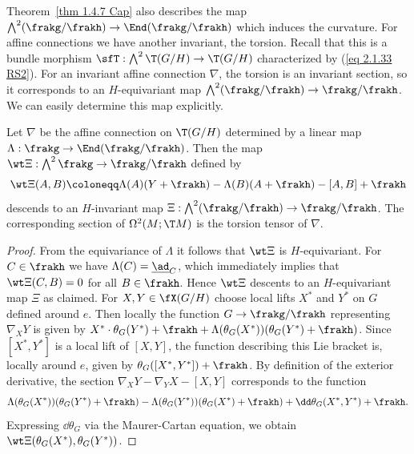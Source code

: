 Theorem~\ref{thm 1.4.7 Cap} also describes the map $\bigwedge^2(\frakg\slash\frakh)\to \End(\frakg\slash\frakh)$ which induces the curvature. For affine connections we have another invariant, the torsion. Recall that this is a bundle morphism $\sfT:\bigwedge^2 \T(G\slash H)\to \T(G\slash H)$ characterized by (\ref{eq 2.1.33 RS2}). For an invariant affine connection $\nabla$, the torsion is an invariant section, so it corresponds to an $H$-equivariant map $\bigwedge^2(\frakg\slash\frakh)\to \frakg\slash\frakh$. We can easily determine this map explicitly.

\begin{prop}\label{prop 1.4.8 Cap}
    Let $\nabla$ be the affine connection on $\T(G\slash H)$ determined by a linear map $\Lambda:\frakg\to\End(\frakg\slash\frakh)$. Then the map $\wt\Xi:\bigwedge^2\frakg\to \frakg\slash\frakh$ defined by 
    \[\wt\Xi(A,B)\coloneqq \Lambda(A)(Y+\frakh)-\Lambda(B)(A+\frakh)-[A,B]+\frakh\]
    descends to an $H$-invariant map $\Xi:\bigwedge^2(\frakg\slash\frakh)\to \frakg\slash\frakh$. The corresponding section of $\Omega^2(M;\T M)$ is the torsion tensor of $\nabla$.
\end{prop}
\begin{proof}
    From the equivariance of $\Lambda$ it follows that $\wt\Xi$ is $H$-equivariant. For $C\in\frakh$ we have $\Lambda(C)=\underline{\ad}_C$, which immediately implies that $\wt\Xi(C,B)=0$ for all $B\in\frakh$. Hence $\wt\Xi$ descents to an $H$-equivariant map $\Xi$ as claimed. For $X,Y\in\fX(G\slash H)$ choose local lifts $X^\ast$ and $Y^\ast$ on $G$ defined around $e$. Then locally the function $G\to \frakg\slash\frakh$ representing $\nabla_X Y$ is given by $X^\ast\cdot\theta_G(Y^\ast)+\frakh+\Lambda(\theta_G(X^\ast))(\theta_G(Y^\ast)+\frakh)$. Since $[X^\ast,Y^\ast]$ is a local lift of $[X,Y]$, the function describing this Lie bracket is, locally around $e$, given by $\theta_G([X^\ast,Y^\ast])+\frakh$. By definition of the exterior derivative, the section $\nabla_X Y-\nabla_Y X-[X,Y]$ corresponds to the function 
    \[\Lambda(\theta_G(X^\ast))(\theta_G(Y^\ast)+\frakh)-\Lambda(\theta_G(Y^\ast))(\theta_G(X^\ast)+\frakh)+\dd\theta_G(X^\ast,Y^\ast)+\frakh.\]
    Expressing $\dd\theta_G$ via the Maurer-Cartan equation, we obtain $\wt\Xi(\theta_G(X^\ast),\theta_G(Y^\ast))$.
\end{proof}

